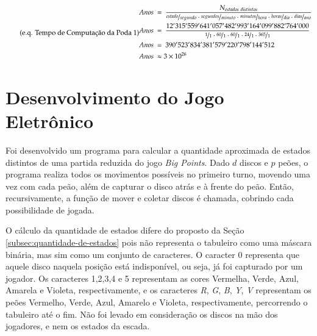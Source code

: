 \begin{equation} \label{eq:anos_poda1} \tag{e.q. Tempo de Computação da Poda 1}
\begin{split}
Anos\ &=\ \dfrac{N_{estados\ distintos}}{\nicefrac{estado}{segundo}\cdot\nicefrac{segundos}{minuto}\cdot\nicefrac{minutos}{hora}\cdot\nicefrac{horas}{dia}\cdot\nicefrac{dias}{ano}}\\
Anos\ &=\ \dfrac{12'315'559'641'057'482'993'164'099'882'764'000}{\nicefrac{1}{1}\cdot\nicefrac{60}{1}\cdot\nicefrac{60}{1}\cdot\nicefrac{24}{1}\cdot\nicefrac{365}{1}}\\
Anos\ &=\ 390'523'834'381'579'220'798'144'512\\
Anos\ &\approx 3\times10^{26}
\end{split}
\end{equation}

\section{Desenvolvimento do Jogo Eletrônico}

Foi desenvolvido um programa para calcular a quantidade aproximada de estados distintos de uma partida reduzida do jogo \emph{Big Points}. Dado $d$ discos e $p$ peões, o programa realiza todos os movimentos possíveis no primeiro turno, movendo uma vez com cada peão, além de capturar o disco atrás e à frente do peão. Então, recursivamente, a função de mover e coletar discos é chamada, cobrindo cada possibilidade de jogada.

O cálculo da quantidade de estados difere do proposto da Seção \ref{subsec:quantidade-de-estados} pois não representa o tabuleiro como uma máscara binária, mas sim como um conjunto de caracteres. O caracter 0 representa que aquele disco naquela posição está indisponível, ou seja, já foi capturado por um jogador. Os caracteres 1,2,3,4 e 5 representam as cores Vermelha, Verde, Azul, Amarela e Violeta, respectivamente, e os caracteres \emph{R}, \emph{G}, \emph{B}, \emph{Y}, \emph{V} representam os peões Vermelho, Verde, Azul, Amarelo e Violeta, respectivamente, percorrendo o tabuleiro até o fim. Não foi levado em consideração os discos na mão dos jogadores, e nem os estados da escada.


